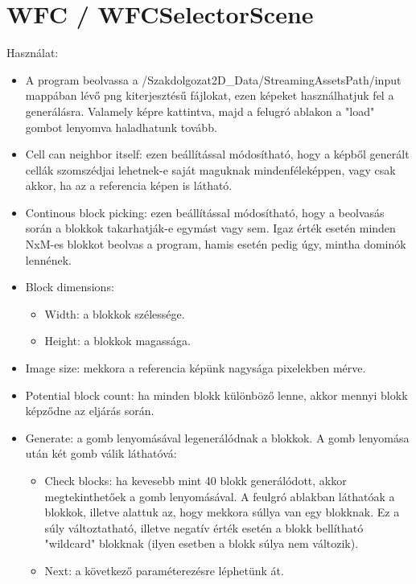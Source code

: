 \section{WFC / WFCSelectorScene}
Használat:
\begin{itemize}
    \label{item:WFC-hasznalat}
        \item A program beolvassa a /Szakdolgozat2D\_Data/StreamingAssetsPath/input \\
        mappában lévő png kiterjesztésű fájlokat, ezen képeket használhatjuk fel a generálásra. Valamely képre kattintva, majd a felugró ablakon a "load" gombot lenyomva haladhatunk tovább.
        \item Cell can neighbor itself: ezen beállítással módosítható, hogy a képből generált cellák szomszédjai lehetnek-e saját maguknak mindenféleképpen, vagy csak akkor, ha az a referencia képen is látható.
        \item Continous block picking: ezen beállítással módosítható, hogy a beolvasás során a blokkok takarhatják-e egymást vagy sem. Igaz érték esetén minden NxM-es blokkot beolvas a program, hamis esetén pedig úgy, mintha dominók lennének.
        \item Block dimensions: 
        \begin{itemize}
            \item Width: a blokkok szélessége.
            \item Height: a blokkok magassága.
        \end{itemize}
        \item Image size: mekkora a referencia képünk nagysága pixelekben mérve.
        \item Potential block count: ha minden blokk különböző lenne, akkor mennyi blokk képződne az eljárás során.
        \item Generate: a gomb lenyomásával legenerálódnak a blokkok. A gomb lenyomása után két gomb válik láthatóvá:
        \begin{itemize}
            \item Check blocks: ha kevesebb mint 40 blokk generálódott, akkor megtekinthetőek a gomb lenyomásával.  A feulgró ablakban láthatóak a blokkok, illetve alattuk az, hogy mekkora súllya van egy blokknak. Ez a súly változtatható, illetve negatív érték esetén a blokk bellítható "wildcard" blokknak (ilyen esetben a blokk súlya nem változik).
            \item Next: a következő paraméterezésre léphetünk át.
        \end{itemize}
\end{itemize}
